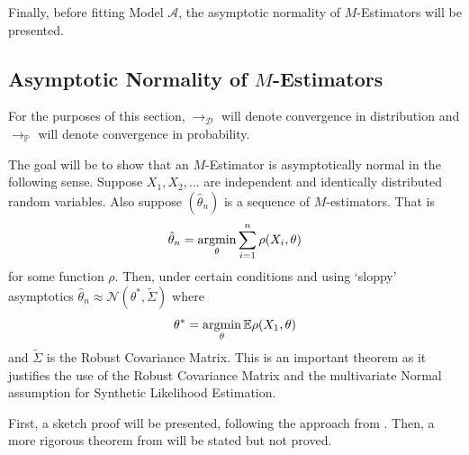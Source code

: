 Finally, before fitting Model $\mathcal{A}$, the asymptotic normality of $M$-Estimators will be presented.

\subsection{Asymptotic Normality of \texorpdfstring{$M$}{M}-Estimators}
\label{subsec:theoretical-properties}

For the purposes of this section, $\to_{\mathcal{D}}$ will denote convergence in distribution and $\to_{\mathbb{P}}$ will denote convergence in probability.

The goal will be to show that an $M$-Estimator is asymptotically normal in the following sense. Suppose $X_1, X_2, \dots$ are independent and identically distributed random variables. Also suppose $(\hat{\theta}_n)$ is a sequence of $M$-estimators. That is
\begin{equation}
    \label{eqn:estimators}
    \hat{\theta}_n = \argmin_{\theta} \sum_{i=1}^n \rho(X_i, \theta)
\end{equation}
for some function $\rho$. Then, under certain conditions and using `sloppy' asymptotics $\hat{\theta}_n \approx \mathcal{N}(\theta^*, \tilde{\Sigma})$ where
\begin{equation}
    \theta^* = \argmin_{\theta} \mathbb{E} \rho(X_1, \theta)
\end{equation}
and $\tilde{\Sigma}$ is the Robust Covariance Matrix. This is an important theorem as it justifies the use of the Robust Covariance Matrix and the multivariate Normal assumption for Synthetic Likelihood Estimation.

First, a sketch proof will be presented, following the approach from \cite{geyer_2013}. Then, a more rigorous theorem from \cite{pollard_1985} will be stated but not proved.

